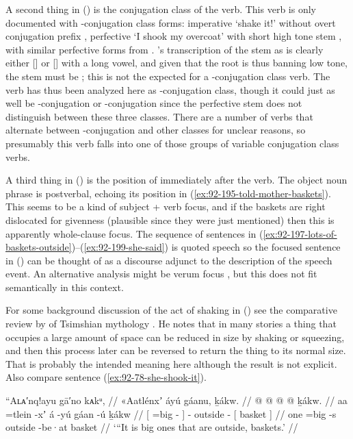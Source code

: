 A second thing in (\lastx) is the conjugation class of the verb.
This verb is only documented with -conjugation class forms: imperative  ‘shake it!’ without overt conjugation prefix \parencite[186.2562]{story-naish:1973}, perfective  ‘I shook my overcoat’ with short high tone stem  \parencite[186.2563]{story-naish:1973}, with similar perfective forms from \textcites[03/88]{leer:1973}[183]{leer:1976}.
\citeauthor{swanton:1909}’s transcription of the stem as  is clearly either [] or [] with a long vowel, and given that the root is  thus banning low tone, the stem must be ; this is not the  expected for a -conjugation class verb.
The verb has thus been analyzed here as -conjugation class, though it could just as well be -conjugation or -conjugation since the perfective stem does not distinguish between these three classes.
There are a number of verbs that alternate between -conjugation and other classes for unclear reasons, so presumably this verb falls into one of those groups of variable conjugation class verbs.

A third thing in (\lastx) is the position of  immediately after the verb.
The object noun phrase is postverbal, echoing its position in (\ref{ex:92-195-told-mother-baskets}).
This seems to be a kind of subject + verb focus, and if the baskets are right dislocated for givenness (plausible since they were just mentioned) then this is apparently whole-clause focus.
The sequence of sentences in (\ref{ex:92-197-lots-of-baskets-outside})–(\ref{ex:92-199-she-said}) is quoted speech so the focused sentence in (\lastx) can be thought of as a discourse adjunct to the description of the speech event.
An alternative analysis might be verum focus \parencites{lohnstein:2016}, but this does not fit semantically in this context.

For some background discussion of the act of shaking in (\lastx) see the comparative review by \citeauthor{boas:1916} of Tsimshian mythology \parencite[466–467]{boas:1916}.
He notes that in many stories a thing that occupies a large amount of space can be reduced in size by shaking or squeezing, and then this process later can be reversed to return the thing to its normal size.
That is probably the intended meaning here although the result is not explicit.
Also compare sentence (\ref{ex:92-78-she-shook-it}).

\ex\label{ex:92-197-lots-of-baskets-outside}%
%
\begingl
	\glpreamble	“Aʟᴀ′nq!ayu gā′no kᴀkᵘ, //
	\glpreamble	«\!Aatlénxʼ áyú gáanu, ḵákw. //
	\gla	{}  @ {} @ {} {}  @ {}
		 @ {}
		{} ḵákw. {} //
	\glb	{} aa =tlein -xʼ {} á -yú
		gáan -ú
		{} ḵákw {} //
	\glc	{}[  =big - {}]  -
		outside -
		{}[ basket {}] //
	\gld	{} one =big -s {}  {}
		outside -be·at
		{} basket {} //
	\glft	‘“It is big ones that are outside, baskets.’
		//
\endgl
\xe

